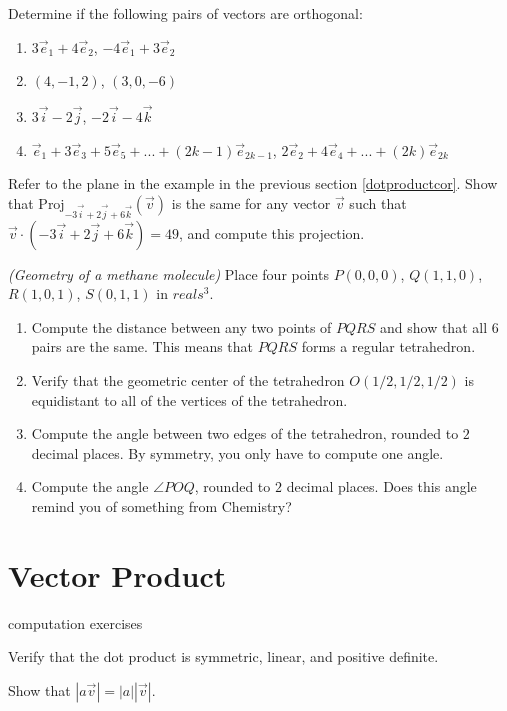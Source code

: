 \begin{exerciselist}
	\item Determine if the following pairs of vectors are orthogonal: \begin{enumerate}[label=(\alph*)]
		\item $3\vec{e}_1+4\vec{e}_2$, $-4\vec{e}_1+3\vec{e}_2$
		\item $(4,-1,2)$, $(3,0,-6)$
		\item $3\vec{i}-2\vec{j}$, $-2\vec{i}-4\vec{k}$
		\item $\vec{e}_1 + 3\vec{e}_3 + 5\vec{e}_5+ ...+(2k-1)\vec{e}_{2k-1}$, $2\vec{e}_2+4\vec{e}_4+...+(2k)\vec{e}_{2k}$
	\end{enumerate}
	\item Refer to the plane in the example in the previous section \ref{dotproductcor}. Show that $\textrm{Proj}_{-3\vec{i}+2\vec{j}+6\vec{k}}(\vec{v})$ is the same for any vector $\vec{v}$ such that $\vec{v}\cdot(-3\vec{i}+2\vec{j}+6\vec{k}) =49$, and compute this projection.
	\item \textit{(Geometry of a methane molecule)} Place four points $P(0,0,0)$, $Q(1,1,0)$, $R(1,0,1)$, $S(0,1,1)$ in $reals^3$. \begin{enumerate}[label=(\alph*)]
		\item Compute the distance between any two points of $PQRS$ and show that all $6$ pairs are the same. This means that $PQRS$ forms a regular tetrahedron.
		\item  Verify that the geometric center of the tetrahedron $O(1/2, 1/2, 1/2)$ is equidistant to all of the vertices of the tetrahedron.
		\item Compute the angle between two edges of the tetrahedron, rounded to $2$ decimal places. By symmetry, you only have to compute one angle.
		\item Compute the angle $\angle POQ$, rounded to $2$ decimal places. Does this angle remind you of something from Chemistry?
	\end{enumerate}
\end{exerciselist}
\section{Vector Product}
\exercises
\begin{exerciselist}
	\item computation exercises
	\item Verify that the dot product is symmetric, linear, and positive definite.
	\item Show that $|a\vec{v}| = |a||\vec{v}|$.
\end{exerciselist}
	
	

